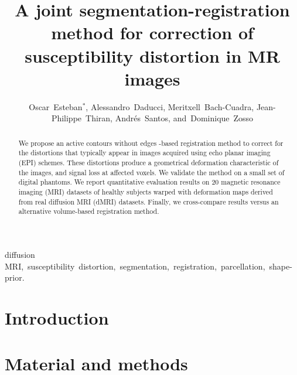 \documentclass{llncs}
\title{A joint segmentation-registration method for correction of susceptibility distortion in MR images}
\author{Oscar~Esteban$^{*}$,
        Alessandro~Daducci,
        Meritxell~Bach-Cuadra,
        Jean-Philippe~Thiran,
        Andr\'es~Santos,
        and~Dominique~Zosso%
}
\begin{document}
\maketitle

\begin{abstract}
We propose an active contours without edges \mbox{-based} registration method
  to correct for the distortions that typically appear in
  images acquired using echo planar imaging (EPI) schemes.
These distortions produce a geometrical deformation characteristic of the images,
  and signal loss at affected voxels.
We validate the method on a small set of digital phantoms.
We report quantitative evaluation results on 20 magnetic resonance imaging (MRI) 
  datasets of healthy subjects warped with deformation maps derived from real 
  diffusion MRI (dMRI) datasets.
Finally, we cross-compare results versus an alternative volume-based registration
  method.
\end{abstract}

\begin{keywords}
diffusion MRI,~susceptibility~distortion,~segmentation,~registration,~parcellation,~shape-prior.
\end{keywords}

\section{Introduction}\label{sec:intro}

\section{Material and methods}\label{sec:methods}




\end{document}
